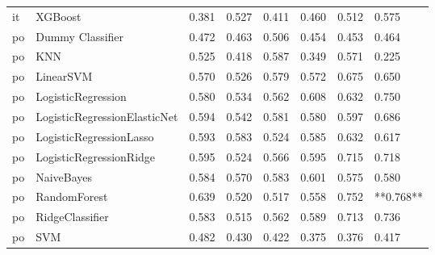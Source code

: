 \begin{tabular}{llllllll}
      it &                      XGBoost & 0.381 &                     0.527 &                 0.411 &                  0.460 &                                   0.512 &     0.575 \\
      po &             Dummy Classifier & 0.472 &                     0.463 &                 0.506 &                  0.454 &                                   0.453 &     0.464 \\
      po &                          KNN & 0.525 &                     0.418 &                 0.587 &                  0.349 &                                   0.571 &     0.225 \\
      po &                    LinearSVM & 0.570 &                     0.526 &                 0.579 &                  0.572 &                                   0.675 &     0.650 \\
      po &           LogisticRegression & 0.580 &                     0.534 &                 0.562 &                  0.608 &                                   0.632 &     0.750 \\
      po & LogisticRegressionElasticNet & 0.594 &                     0.542 &                 0.581 &                  0.580 &                                   0.597 &     0.686 \\
      po &      LogisticRegressionLasso & 0.593 &                     0.583 &                 0.524 &                  0.585 &                                   0.632 &     0.617 \\
      po &      LogisticRegressionRidge & 0.595 &                     0.524 &                 0.566 &                  0.595 &                                   0.715 &     0.718 \\
      po &                   NaiveBayes & 0.584 &                     0.570 &                 0.583 &                  0.601 &                                   0.575 &     0.580 \\
      po &                 RandomForest & 0.639 &                     0.520 &                 0.517 &                  0.558 &                                   0.752 & **0.768** \\
      po &              RidgeClassifier & 0.583 &                     0.515 &                 0.562 &                  0.589 &                                   0.713 &     0.736 \\
      po &                          SVM & 0.482 &                     0.430 &                 0.422 &                  0.375 &                                   0.376 &     0.417 \\

\end{tabular}

